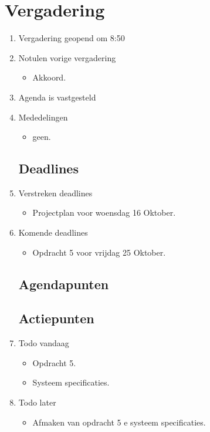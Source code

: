 \documentclass{article}
\begin{document}
\section*{Vergadering}
\begin{enumerate}
	
	\subsection*{Vooraf}
	\item Vergadering geopend om 8:50 %
	\item Notulen vorige vergadering
	\begin{itemize}
		\item Akkoord.
	\end{itemize}
	\item Agenda is vastgesteld
	\item Mededelingen
	\begin{itemize}
		\item geen.
	\end{itemize}

	\subsection*{Deadlines}
	\item Verstreken deadlines
	\begin{itemize}
		\item Projectplan voor woensdag 16 Oktober.
	\end{itemize}
	\item Komende deadlines
	\begin{itemize}
		\item Opdracht 5 voor vrijdag 25 Oktober.
	\end{itemize}

	\subsection*{Agendapunten}
	

	\subsection*{Actiepunten}
	\item Todo vandaag
	\begin{itemize}
		\item Opdracht 5.
		\item Systeem specificaties.
	\end{itemize}
	\item Todo later
	\begin{itemize}
		\item Afmaken van opdracht 5 e systeem specificaties.
	\end{itemize}


\end{enumerate}
\end{document}
